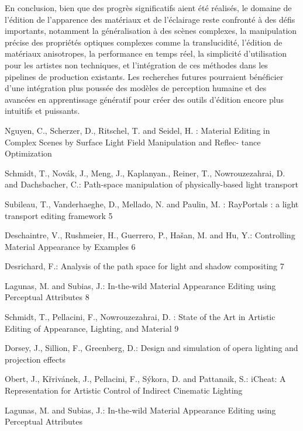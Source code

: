 \documentclass[runningheads]{llncs}
\begin{document}
En conclusion, bien que des progrès significatifs aient été réalisés, le domaine de l'édition de l'apparence des matériaux et de l'éclairage reste confronté à des défis importants, notamment la généralisation à des scènes complexes, la manipulation précise des propriétés optiques complexes comme la translucidité, l'édition de matériaux anisotropes, la performance en temps réel, la simplicité d'utilisation pour les artistes non techniques, et l'intégration de ces méthodes dans les pipelines de production existants. Les recherches futures pourraient bénéficier d'une intégration plus poussée des modèles de perception humaine et des avancées en apprentissage génératif pour créer des outils d'édition encore plus intuitifs et puissants.


%
%
%
% 
% 
%
\begin{thebibliography}{8}
\bibitem{}
Nguyen, C., Scherzer, D., Ritschel, T. and Seidel, H. : Material Editing in Complex Scenes by Surface Light Field Manipulation and Reflec-
tance Optimization

\bibitem{}
Schmidt, T., Novák, J., Meng, J., Kaplanyan., Reiner, T., Nowrouzezahrai, D. and Dachsbacher, C.: Path-space manipulation of physically-based light transport

\bibitem{}
Subileau, T., Vanderhaeghe, D., Mellado, N. and Paulin, M. : RayPortals : a light transport editing framework 5

\bibitem{}
Deschaintre, V., Rushmeier, H., Guerrero, P., Hašan, M. and Hu, Y.: Controlling Material Appearance by Examples 6

\bibitem{}
Desrichard, F.: Analysis of the path space for light and shadow compositing 7

\bibitem{}
Lagunas, M. and Subias, J.: In-the-wild Material Appearance Editing using Perceptual Attributes 8

\bibitem{}
Schmidt, T., Pellacini, F., Nowrouzezahrai, D. : State of the Art in Artistic Editing of Appearance, Lighting, and Material 9

\bibitem{}
Dorsey, J., Sillion, F., Greenberg, D.: Design and simulation of opera lighting and projection effects

\bibitem{}
Obert, J., Křrivánek, J., Pellacini, F., Sýkora, D. and Pattanaik, S.: iCheat: A Representation for Artistic Control of Indirect Cinematic Lighting

\bibitem{}
Lagunas, M. and Subias, J.: In-the-wild Material Appearance Editing using Perceptual Attributes

\end{thebibliography}
\end{document}
